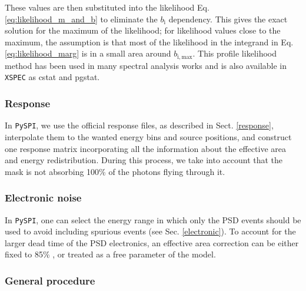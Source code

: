 \documentclass{aa}
\begin{document}
\noindent
These values are then substituted into the likelihood Eq. \ref{eq:likelihood_m_and_b} to eliminate the $b_{\mathrm{i}}$ dependency. This gives the exact solution for the maximum of the likelihood; for likelihood values close to the maximum, the assumption is that most of the likelihood in the integrand in Eq. \ref{eq:likelihood_marg} is in a small area around $b_{\mathrm{i,max}}$.
This profile likelihood method has been used in many spectral analysis works \citep[e.g.][]{profile2, profile1} and is also available in {\tt XSPEC} \citep{xspec} as cstat and pgstat.

\subsubsection{Response}

In {\tt PySPI}, we use the official response files, as described in Sect. \ref{response}, interpolate them to the wanted energy bins and source positions, and construct one response matrix incorporating all the information about the effective area and energy redistribution. During this process, we take into account that the mask is not absorbing 100\% of the photons flying through it.

\subsubsection{Electronic noise}

In {\tt PySPI}, one can select the energy range in which only the PSD events should be used to avoid including spurious events (see Sec. \ref{electronic}). To account for the larger dead time of the PSD electronics, an effective area correction can be either fixed to 85\% \citep{spi_electronic_noise}, or treated as a free parameter of the model.

\subsubsection{General procedure}
\end{document}
